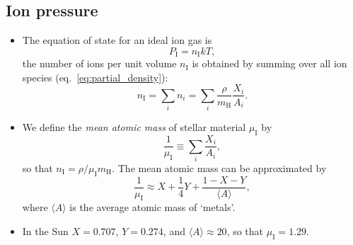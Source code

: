 \documentclass[10pt,amsmath,amssymb,aps,pra]{revtex4-2}
\newcommand{\sub}[1]{_{\text{#1}}}
\newcommand{\mh}{m\sub{H}}
\newcommand{\mean}[1]{\langle{#1}\rangle}
\begin{document}
\subsection{Ion pressure}
\begin{itemize}
\item The equation of state for an ideal ion gas is
\begin{equation}
P\sub{I} = n\sub{I}kT,
\end{equation}
the number of ions per unit volume $n\sub{I}$ is obtained by summing over all
ion species (eq.~\ref{eq:partial_density}):
\begin{equation}
n\sub{I} = \sum_in_i = \sum_i\frac{\rho}{\mh}\frac{X_i}{A_i}.
\end{equation}

\item We define the \emph{mean atomic mass} of stellar material $\mu\sub{I}$ by
\begin{equation}
\frac{1}{\mu\sub{I}}\equiv\sum_i\frac{X_i}{A_i},
\end{equation}
so that $n\sub{I}=\rho/\mu\sub{I}\mh$. The mean atomic mass can be
approximated by
\begin{equation}
\frac{1}{\mu\sub{I}}\approx{X} + \frac{1}{4}Y + \frac{1-X-Y}{\mean{A}},
\end{equation}
where $\mean{A}$ is the average atomic mass of `metals'.

\item In the Sun $X=0.707$, $Y=0.274$, and $\mean{A}\approx{20}$, so that
$\mu\sub{I}={1.29}$.
\end{itemize}
\end{document}

